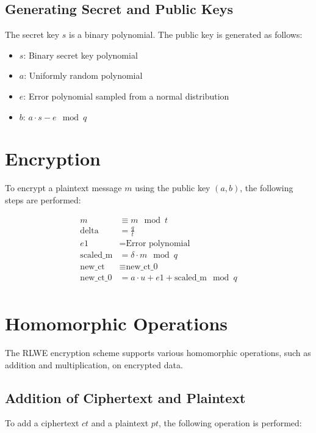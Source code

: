 \documentclass{article}
\begin{document}
\subsection{Generating Secret and Public Keys}

The secret key $s$ is a binary polynomial. The public key is generated as follows:

\begin{itemize}
    \item $s$: Binary secret key polynomial
    \item $a$: Uniformly random polynomial
    \item $e$: Error polynomial sampled from a normal distribution
    \item $b$: $a \cdot s - e \mod q$
\end{itemize}

\section{Encryption}

To encrypt a plaintext message $m$ using the public key $(a, b)$, the following steps are performed:

\begin{align*}
    m &\equiv m \mod t \\
    \text{delta} &= \frac{q}{t} \\
    e1 &= \text{Error polynomial} \\
    \text{scaled\_m} &= \delta \cdot m \mod q \\
    \text{new\_ct} &\equiv \text{new\_ct\_0} \\
    \text{new\_ct\_0} &= a \cdot u + e1 + \text{scaled\_m} \mod q \\
\end{align*}

\section{Homomorphic Operations}

The RLWE encryption scheme supports various homomorphic operations, such as addition and multiplication, on encrypted data.

\subsection{Addition of Ciphertext and Plaintext}

To add a ciphertext $ct$ and a plaintext $pt$, the following operation is performed:
\end{document}
